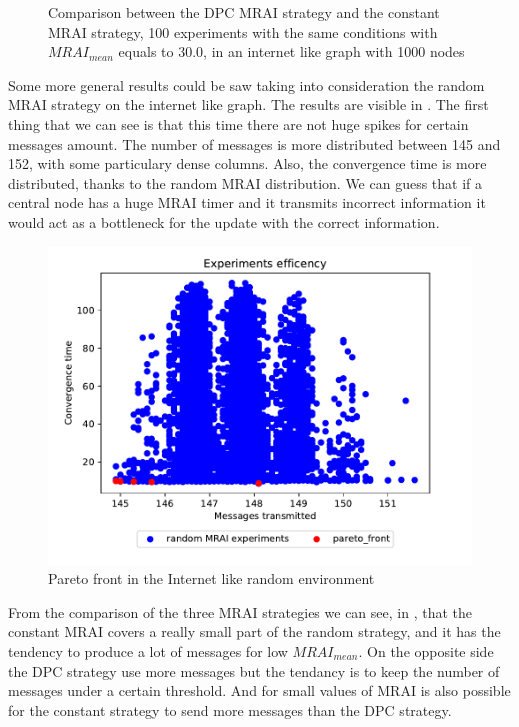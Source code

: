 \documentclass[10pt,conference,letterpaper]{IEEEtran}
\newcommand{\figwidth}{0.78}
\newcommand{\figvspace}{-1.5em}
\begin{document}
\begin{figure}[tb]
	\caption{Comparison between the \ac{DPC} \ac{MRAI} strategy and the constant \ac{MRAI}
			 strategy, 100 experiments with the same conditions with $MRAI_{mean}$
			 equals to \num{30.0}, in an internet like graph with \num{1000} nodes
			 }
	\label{fig:dpc_vs_constant_1000}
	\vspace{\figvspace}
\end{figure}

Some more general results could be saw taking into consideration the random \ac{MRAI}
strategy on the internet like graph.
The results are visible in .
The first thing that we can see is that this time there are not huge spikes 
for certain messages amount.
The number of messages is more distributed between \num{145} and \num{152}, with 
some particulary dense columns.
Also, the convergence time is more distributed, thanks to the random \ac{MRAI} distribution.
We can guess that if a central node has a huge \ac{MRAI} timer and it transmits
incorrect information it would act as a bottleneck for the update with the 
correct information.

\begin{figure}[tb]
	\centering
	\includegraphics[width=\figwidth\columnwidth]{images/internet_like/graph-100-random/random-multiple_mrais}
	\caption{Pareto front in the Internet like random environment}
	\label{fig:random_mrai_pareto_freq}
	\vspace{\figvspace}
\end{figure}

From the comparison of the three \ac{MRAI} strategies we can see, in ,
that the constant \ac{MRAI} covers a really small part of the random strategy,
and it has the tendency to produce a lot of messages for low $MRAI_{mean}$.
On the opposite side the \ac{DPC} strategy use more messages but the tendancy
is to keep the number of messages under a certain threshold.
And for small values of \ac{MRAI} is also possible for the constant strategy
to send more messages than the \ac{DPC} strategy.
\end{document}
